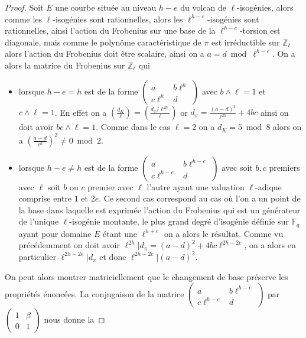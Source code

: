 \documentclass[10pt,a4paper]{book}
\theoremstyle{plain}
\theoremstyle{definition}
\theoremstyle{definition}
\theoremstyle{definition}
\theoremstyle{definition}
\theoremstyle{remark}
\theoremstyle{remark}
\theoremstyle{definition}
\begin{document}
\begin{proof}
Soit $E$ une courbe située au niveau $h-e$ du volcan de $\ell$-isogénies, alors
comme les $\ell$-isogénies sont rationnelles, alors les $\ell^{h-e}$-isogénies 
sont rationnelles, ainsi l'action du Frobenius sur une base de la 
$\ell^{h-e}$-torsion est diagonale, mais comme le polynôme caractéristique de 
$\pi$ est irréductible sur $\mathbb{Z}_{\ell}$ alors l'action du Frobenius doit
être scalaire, ainsi on a $a=d \bmod \ell^{h-e}$.
On a alors la matrice du Frobenius sur $\mathbb{Z}_{\ell}$ qui  
\begin{itemize}
\item lorsque $h-e=h$ est de la forme $\left ( \begin{smallmatrix}a & b\ell^{h}\\c\ell^{h} & d
\end{smallmatrix}\right )$ avec $b \wedge \ell=1$ et $c \wedge \ell=1$. En 
effet on a $\left(\frac{d_K}{\ell}\right)=\left(\frac{d_{\pi}/\ell^{2h}}{\ell}
\right)$ or $d_{\pi}=\frac{(a-d)^2}{\ell^{2h}}+4bc$ ainsi on doit avoir $bc 
\wedge \ell=1$. Comme dans le cas $\ell=2$ on a $d_K=5 \bmod 8$ alors on a 
$(\frac{a-d}{\ell^{h}})^2 \neq 0 \bmod 2$.
\item lorsque $h-e \neq h$ est de la forme  $\left ( \begin{smallmatrix}a & 
b\ell^{h-e}\\ c\ell^{h-e}  & d \end{smallmatrix}\right )$ avec soit $b, c$ 
premiers avec $\ell$ soit $b$ ou $c$ premier avec $\ell$ l'autre ayant une 
valuation $\ell$-adique comprise entre $1$ et $2e$. Ce second cas correspond au
cas où l'on a un point de la base dans laquelle est exprimée l'action du 
Frobenius qui est un générateur de l'unique $\ell$-isogénie montante, le plus 
grand degré d'isogénie définie sur $\mathbb{F}_q$ ayant pour domaine $E$ étant 
une $\ell^{h+e}$ on a alors le résultat. Comme vu précédemment on doit avoir 
$\ell^{2h} | d_{\pi}=(a-d)^2+4bc\ell^{2h-2e}$, on a alors en particulier 
$\ell^{2h-2e} | d_{\pi}$ et donc $\ell^{2h-2e} | (a-d)^2$.
\end{itemize}
On peut alors montrer matriciellement que le changement de base préserve les 
propriétés énoncées. La conjugaison de la matrice $\left ( \begin{smallmatrix}a
& b\ell^{h-e}\\c\ell^{h-e} & d \end{smallmatrix}\right )$ par~$\left ( 
\begin{smallmatrix}1 & \beta \\0 & 1 \end{smallmatrix} \right )$ nous donne la

\end{proof}
\end{document}

